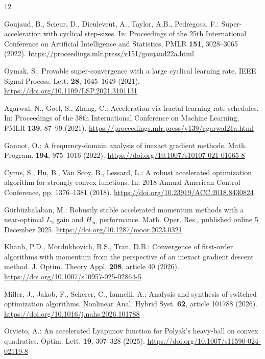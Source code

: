 \documentclass[pdflatex,sn-mathphys-num]{sn-jnl}
\theoremstyle{thmstyleone}
\theoremstyle{thmstyletwo}
\begin{document}
\begin{thebibliography}{12}
\raggedright
{}
Goujaud, B., Scieur, D., Dieuleveut, A., Taylor, A.B., Pedregosa, F.:
Super-acceleration with cyclical step-sizes.
In: Proceedings of the 25th International Conference on Artificial
Intelligence and Statistics, PMLR \textbf{151}, 3028--3065 (2022).
\url{https://proceedings.mlr.press/v151/goujaud22a.html}

Oymak, S.: Provable super-convergence with a large cyclical learning rate.
IEEE Signal Process. Lett. \textbf{28}, 1645--1649 (2021).
\url{https://doi.org/10.1109/LSP.2021.3101131}

Agarwal, N., Goel, S., Zhang, C.: Acceleration via fractal learning rate schedules.
In: Proceedings of the 38th International Conference on Machine Learning,
PMLR \textbf{139}, 87--99 (2021).
\url{https://proceedings.mlr.press/v139/agarwal21a.html}

Gannot, O.: A frequency-domain analysis of inexact gradient methods.
Math. Program. \textbf{194}, 975--1016 (2022).
\url{https://doi.org/10.1007/s10107-021-01665-8}

Cyrus, S., Hu, B., Van Scoy, B., Lessard, L.:
A robust accelerated optimization algorithm for strongly convex functions.
In: 2018 Annual American Control Conference, pp. 1376--1381 (2018).
\url{https://doi.org/10.23919/ACC.2018.8430824}

G\"urb\"uzbalaban, M.: Robustly stable accelerated momentum methods with a
near-optimal $L_2$ gain and $H_\infty$ performance.
Math. Oper. Res., published online 5 December 2025.
\url{https://doi.org/10.1287/moor.2023.0321}

Khanh, P.D., Mordukhovich, B.S., Tran, D.B.:
Convergence of first-order algorithms with momentum from the perspective
of an inexact gradient descent method.
J. Optim. Theory Appl. \textbf{208}, article 40 (2026).
\url{https://doi.org/10.1007/s10957-025-02864-5}

Miller, J., Jakob, F., Scherer, C., Iannelli, A.:
Analysis and synthesis of switched optimization algorithms.
Nonlinear Anal. Hybrid Syst. \textbf{62}, article 101788 (2026).
\url{https://doi.org/10.1016/j.nahs.2026.101788}

Orvieto, A.: An accelerated Lyapunov function for Polyak's heavy-ball
on convex quadratics. Optim. Lett. \textbf{19}, 307--328 (2025).
\url{https://doi.org/10.1007/s11590-024-02119-8}


\end{thebibliography}
\end{document}
